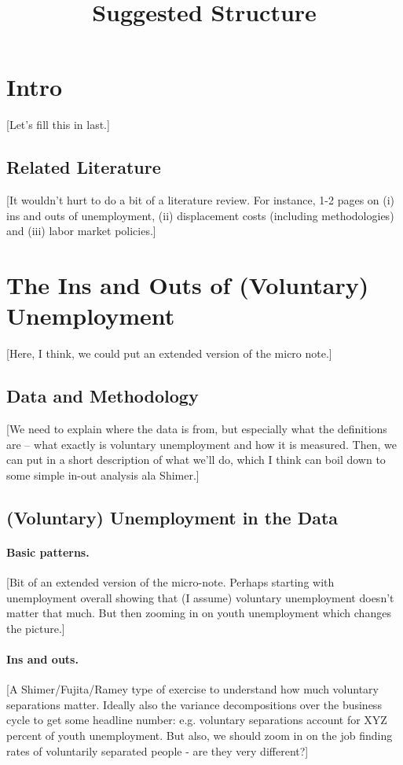 \documentclass[12pt,a4paper]{article}
\begin{document}
	

\title{Suggested Structure}

\maketitle

\section{Intro}
[Let's fill this in last.]

\subsection{Related Literature}
[It wouldn't hurt to do a bit of a literature review. For instance, 1-2 pages on (i) ins and outs of unemployment, (ii) displacement costs (including methodologies) and (iii) labor market policies.]

\section{The Ins and Outs of (Voluntary) Unemployment}
[Here, I think, we could put an extended version of the micro note.]

\subsection{Data and Methodology}
[We need to explain where the data is from, but especially what the definitions are -- what exactly is voluntary unemployment and how it is measured. Then, we can put in a short description of what we'll do, which I think can boil down to some simple in-out analysis ala Shimer.]

\subsection{(Voluntary) Unemployment in the Data}

\paragraph{Basic patterns.} [Bit of an extended version of the micro-note. Perhaps starting with unemployment overall showing that (I assume) voluntary unemployment doesn't matter that much. But then zooming in on youth unemployment which changes the picture.]

\paragraph{Ins and outs.} [A Shimer/Fujita/Ramey type of exercise to understand how much voluntary separations matter. Ideally also the variance decompositions over the business cycle to get some headline number: e.g. voluntary separations account for XYZ percent of youth unemployment. But also, we should zoom in on the job finding rates of voluntarily separated people - are they very different?]
\end{document}
